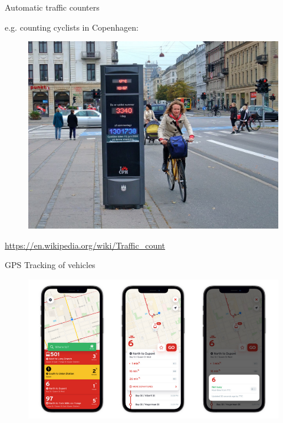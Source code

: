 \documentclass[aspectratio=169]{beamer}
\begin{document}
\begin{frame}
	
	Automatic traffic counters
	\vspace{2mm}
	
	e.g. counting cyclists in Copenhagen:
	
	\begin{figure}
		\centering
		\includegraphics[width=0.7\linewidth]{images/bike_counter_copenhagen}
	\end{figure}
	
	\tiny\url{https://en.wikipedia.org/wiki/Traffic_count}
	
\end{frame}




\begin{frame}
	
	GPS Tracking of vehicles
	
	\begin{figure}
		\centering
		\includegraphics[width=0.7\linewidth]{images/transit_app}
	\end{figure}
	
\end{frame}
\end{document}
